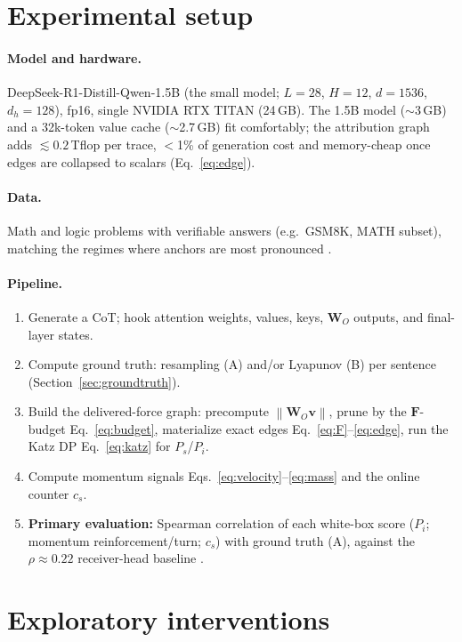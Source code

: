 \documentclass[11pt]{article}
\newcommand{\F}{\mathbf{F}}
\newcommand{\WO}{\mathbf{W}_O}
\newcommand{\vv}{\mathbf{v}}
\newcommand{\norm}[1]{\left\lVert #1 \right\rVert}
\begin{document}
\section{Experimental setup}
\label{sec:setup}

\paragraph{Model and hardware.} DeepSeek-R1-Distill-Qwen-1.5B (the \cite{bogdan2025thought} small
model; $L=28$, $H=12$, $d=1536$, $d_h=128$), fp16, single NVIDIA RTX TITAN (24\,GB).
The 1.5B model ($\sim$3\,GB) and a 32k-token value cache ($\sim$2.7\,GB) fit comfortably; the
attribution graph adds $\lesssim$$0.2$\,Tflop per trace, $<$1\% of generation cost and
memory-cheap once edges are collapsed to scalars (Eq.~\eqref{eq:edge}).

\paragraph{Data.} Math and logic problems with verifiable answers (e.g.\ GSM8K, MATH subset),
matching the regimes where anchors are most pronounced \cite{bogdan2025thought}.

\paragraph{Pipeline.}
\begin{enumerate}[leftmargin=1.6em,itemsep=2pt]
\item Generate a CoT; hook attention weights, values, keys, $\WO$ outputs, and final-layer states.
\item Compute ground truth: resampling (A) and/or Lyapunov (B) per sentence
(Section~\ref{sec:groundtruth}).
\item Build the delivered-force graph: precompute $\norm{\WO\vv}$, prune by the $\F$-budget
Eq.~\eqref{eq:budget}, materialize exact edges Eq.~\eqref{eq:F}--\eqref{eq:edge}, run the Katz DP
Eq.~\eqref{eq:katz} for $P_s$/$P_i$.
\item Compute momentum signals Eqs.~\eqref{eq:velocity}--\eqref{eq:mass} and the online counter
$c_s$.
\item \textbf{Primary evaluation:} Spearman correlation of each white-box score
($P_i$; momentum reinforcement/turn; $c_s$) with ground truth (A), against the
$\rho\approx0.22$ receiver-head baseline \cite{bogdan2025thought}.
\end{enumerate}

\section{Exploratory interventions}
\label{sec:explore}
\end{document}

